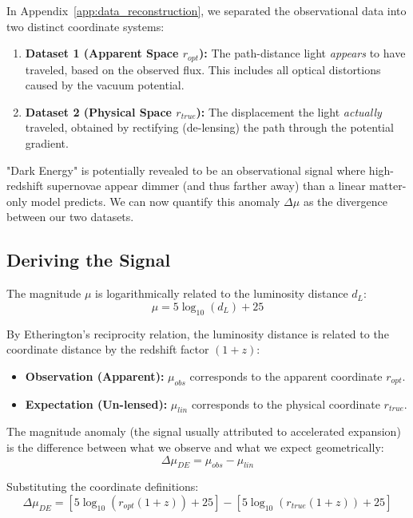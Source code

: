 \documentclass[11pt]{article}
\begin{document}
In Appendix~\ref{app:data_reconstruction}, we separated the observational data into two distinct coordinate systems:
\begin{enumerate}
    \item \textbf{Dataset 1 (Apparent Space $r_{opt}$):} The path-distance light \textit{appears} to have traveled, based on the observed flux. This includes all optical distortions caused by the vacuum potential.
    \item \textbf{Dataset 2 (Physical Space $r_{true}$):} The displacement the light \textit{actually} traveled, obtained by rectifying (de-lensing) the path through the potential gradient.
\end{enumerate}

"Dark Energy" is potentially revealed to be an observational signal where high-redshift supernovae appear dimmer (and thus farther away) than a linear matter-only model predicts. We can now quantify this anomaly $\Delta \mu$ as the divergence between our two datasets.

\subsection{Deriving the Signal}

The magnitude $\mu$ is logarithmically related to the luminosity distance $d_L$:
\begin{equation}
    \mu = 5 \log_{10}(d_L) + 25
\end{equation}

By Etherington's reciprocity relation, the luminosity distance is related to the coordinate distance by the redshift factor $(1+z)$:
\begin{itemize}
    \item \textbf{Observation (Apparent):} $\mu_{obs}$ corresponds to the apparent coordinate $r_{opt}$.
    \item \textbf{Expectation (Un-lensed):} $\mu_{lin}$ corresponds to the physical coordinate $r_{true}$.
\end{itemize}

The magnitude anomaly (the signal usually attributed to accelerated expansion) is the difference between what we observe and what we expect geometrically:
\begin{equation}
    \Delta \mu_{DE} = \mu_{obs} - \mu_{lin}
\end{equation}

Substituting the coordinate definitions:
\begin{equation}
    \Delta \mu_{DE} = \left[ 5 \log_{10}(r_{opt}(1+z)) + 25 \right] - \left[ 5 \log_{10}(r_{true}(1+z)) + 25 \right]
\end{equation}
\end{document}
